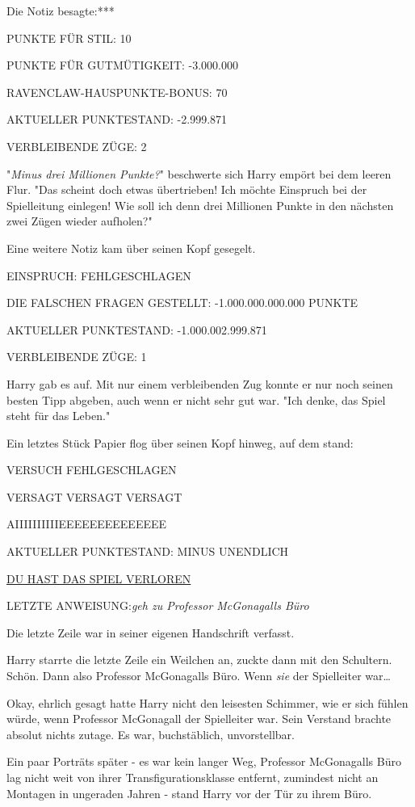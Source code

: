 {Die Notiz besagte:***

PUNKTE FÜR STIL: 10

PUNKTE FÜR GUTMÜTIGKEIT: -3.000.000

RAVENCLAW-HAUSPUNKTE-BONUS: 70

AKTUELLER PUNKTESTAND: -2.999.871

VERBLEIBENDE ZÜGE: 2

"\emph{Minus drei Millionen Punkte?}" beschwerte sich Harry empört bei dem leeren Flur. "Das scheint doch etwas übertrieben! Ich möchte Einspruch bei der Spielleitung einlegen! Wie soll ich denn drei Millionen Punkte in den nächsten zwei Zügen wieder aufholen?"

Eine weitere Notiz kam über seinen Kopf gesegelt.

EINSPRUCH: FEHLGESCHLAGEN

DIE FALSCHEN FRAGEN GESTELLT: -1.000.000.000.000 PUNKTE

AKTUELLER PUNKTESTAND: -1.000.002.999.871

VERBLEIBENDE ZÜGE: 1

Harry gab es auf. Mit nur einem verbleibenden Zug konnte er nur noch seinen besten Tipp abgeben, auch wenn er nicht sehr gut war. "Ich denke, das Spiel steht für das Leben."

Ein letztes Stück Papier flog über seinen Kopf hinweg, auf dem stand:

VERSUCH FEHLGESCHLAGEN

VERSAGT VERSAGT VERSAGT

AIIIIIIIIIIEEEEEEEEEEEEEE

AKTUELLER PUNKTESTAND: MINUS UNENDLICH

\uline{DU HAST DAS SPIEL VERLOREN}

LETZTE ANWEISUNG:\emph{\hfill\break geh zu Professor McGonagalls Büro}

Die letzte Zeile war in seiner eigenen Handschrift verfasst.

Harry starrte die letzte Zeile ein Weilchen an, zuckte dann mit den Schultern. Schön. Dann also Professor McGonagalls Büro. Wenn \emph{sie} der Spielleiter war…

Okay, ehrlich gesagt hatte Harry nicht den leisesten Schimmer, wie er sich fühlen würde, wenn Professor McGonagall der Spielleiter war. Sein Verstand brachte absolut nichts zutage. Es war, buchstäblich, unvorstellbar.

Ein paar Porträts später - es war kein langer Weg, Professor McGonagalls Büro lag nicht weit von ihrer Transfigurationsklasse entfernt, zumindest nicht an Montagen in ungeraden Jahren - stand Harry vor der Tür zu ihrem Büro.

}
